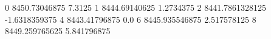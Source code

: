 0 8450.73046875 7.3125
1 8444.69140625 1.2734375
2 8441.7861328125 -1.6318359375
4 8443.41796875 0.0
6 8445.935546875 2.517578125
8 8449.259765625 5.841796875
